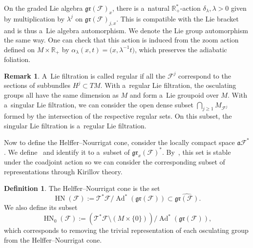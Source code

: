 \documentclass[pdftex]{sigma}
\newcommand{\R}{\mathbb R} %
\newcommand{\F}{\mathcal{F}} %
\newcommand{\Ad}{\operatorname{Ad}} %
\newcommand{\adiab}{\mathfrak{a}} %
\newcommand{\T}{\mathcal{T}} %
\newcommand{\HN}{\operatorname{HN}} %
\newcommand{\Fb}{\mathcal{F}} %
\newcommand{\gr}{\mathfrak{gr}} %
\numberwithin{equation}{section}
\theoremstyle{definition}
\newtheorem{mydef}[thm]{Definition}
\newtheorem{rem}[thm]{Remark}
\begin{document}
On the graded Lie algebra $\gr(\F)_x$, there is a~natural $\R^*_+$-action $\delta_{\lambda}, \lambda>0$ given by multiplication by $\lambda^j$ on $\gr(\Fb)_{j,x}$. This is compatible with the Lie bracket and is thus a~Lie algebra automorphism. We denote the Lie group automorphism the same way. One can check that this action is induced from the zoom action defined on $M \times \R_+$ by $\alpha_{\lambda}(x,t) = \bigl(x,\lambda^{-1}t\bigr)$, which preserves the adiabatic foliation.

\begin{rem}
 A~Lie filtration is called regular if all the $\F^j$ correspond to the sections of subbundles $H^j \subset TM$. With a~regular Lie filtration, the osculating groups all have the same dimension as $M$ and form a~Lie groupoid over $M$. With a~singular Lie filtration, we can consider the open dense subset $\bigcap_{j\geq 1} M_{\F^j}$ formed by the intersection of the respective regular sets. On this subset, the singular Lie filtration is a~regular Lie filtration.
\end{rem}

Now to define the Helffer--Nourrigat cone, consider the locally compact space $\adiab\F^*$. We define~\smash{$\T^*_x\F := \overline{T^*M\times \R^*_+} \cap \adiab\F^*_{(x,0)}$}
and identify it to a~subset of $\gr_x(\Fb)^*$. By~\cite[Proposition~1.12]{AMYMaximalHypoellipticity}, this set is stable under the coadjoint action so we can consider the corresponding subset of representations through Kirillov theory.

\begin{mydef}\label{Def: ConeHF Intrinsic}
 The Helffer--Nourrigat cone is the set
 \[\HN(\Fb) := {\T^*\F}/{\Ad^*(\gr(\Fb))} \subset \widehat{\gr(\Fb)}.\]
 We also define its subset
 \[\HN_0(\Fb) := {(\T^*\F\setminus (M\times \{0\}))}/{\Ad^*(\gr(\Fb))},\]
 which corresponds to removing the trivial representation of each osculating group from the Helffer--Nourrigat cone.
\end{mydef}
\end{document}
